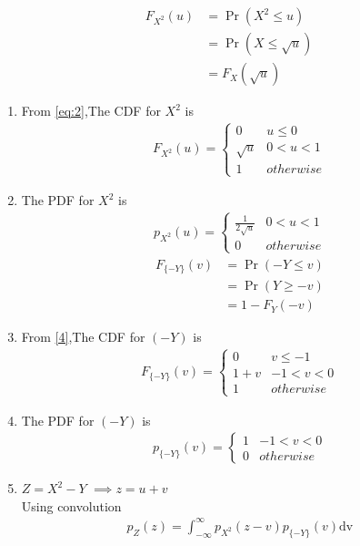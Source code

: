 \documentclass[journal,12pt,twocolumn]{IEEEtran}
\begin{document}
\begin{enumerate}
\begin{enumerate}
\begin{align}
F_{X^2}(u)&=\Pr(X^2 \leq u) \\
          &=\Pr(X \leq \sqrt{u}) \\
          &=F_X(\sqrt{u}) \label{8}
\end{align}
\begin{enumerate}
\item From \eqref{eq:2},The CDF for $X^2$ is
\begin{align}
F_{X^2}(u)  = 
\begin{cases}
      0 & u \leq 0 \\
      \sqrt{u} & 0 < u < 1 \\
      1 & otherwise
\end{cases} \label{9}
\end{align}
\item The PDF for $X^2$ is
\begin{align}
p_{X^2}(u)  = 
\begin{cases}
      \frac{1}{2\sqrt{u}} & 0 < u < 1 \\
      0 & otherwise
\end{cases} \label{10}
\end{align}
\begin{align}
F_{\{-Y\}}(v)&=\Pr(-Y \leq v) \\
          &=\Pr(Y \geq -v) \\
          &=1-F_Y(-v) \label{11}
\end{align}
\item From \eqref{4},The CDF for $(-Y)$ is
\begin{align}
F_{\{-Y\}}(v)  = 
\begin{cases}
      0 & v \leq -1\\
      1+v & -1 < v < 0 \\
      1 & otherwise 
\end{cases}\label{12}
\end{align}
\item The PDF for $(-Y)$ is
\begin{align}
p_{\{-Y\}}(v)  = 
\begin{cases}
      1 & -1 < v < 0 \\
      0 & otherwise
\end{cases} \label{p-y}
\end{align}
\item $Z=X^2-Y$ $\implies  z=u+v$\\
Using convolution
\begin{align}
p_Z(z)=\int_{- \infty}^{\infty} p_{X^2}(z-v)p_{\{-Y\}}(v) \mathrm{dv} \label{pz}

\end{align}
\end{enumerate}
\end{enumerate}
\end{enumerate}
\end{document}
